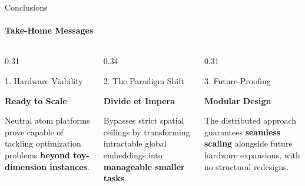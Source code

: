 \documentclass[10pt, aspectratio=169]{beamer}
\begin{document}
\begin{frame}{Conclusions}
    \framesubtitle{Take-Home Messages}
    
    \vspace{0.3cm}
    
    \begin{columns}[T]
        
        \begin{column}{0.31\textwidth}
            \begin{block}{1. Hardware Viability}
                \begin{minipage}[t][4.5cm][t]{\linewidth}
                    \centering
                    \vspace{0.4cm}
                    {\Large \textbf{Ready to Scale}}\\[0.4cm]
                    \raggedright
                    \small Neutral atom platforms prove capable of tackling optimization problems \textbf{beyond toy-dimension instances}.
                \end{minipage}
            \end{block}
        \end{column}
        
        \begin{column}{0.34\textwidth}
            \begin{block}{2. The Paradigm Shift}
                \begin{minipage}[t][4.5cm][t]{\linewidth}
                    \centering
                    \vspace{0.4cm}
                    {\Large \textbf{Divide et Impera}}\\[0.4cm]
                    \raggedright
                    \small Bypasses strict spatial ceilings by transforming intractable global embeddings into \textbf{manageable smaller tasks}.
                \end{minipage}
            \end{block}
        \end{column}
        
        \begin{column}{0.31\textwidth}
            \begin{block}{3. Future-Proofing}
                \begin{minipage}[t][4.5cm][t]{\linewidth}
                    \centering
                    \vspace{0.4cm}
                    {\Large \textbf{Modular Design}}\\[0.4cm]
                    \raggedright
                    \small The distributed approach guarantees \textbf{seamless scaling} alongside future hardware expansions, with no structural redesigns.
                \end{minipage}
            \end{block}
        \end{column}
        

\end{columns}
\end{frame}
\end{document}
